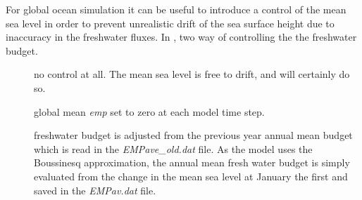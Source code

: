 \documentclass[../main/NEMO_manual]{subfiles}
\begin{document}
For global ocean simulation it can be useful to introduce a control of the mean sea level in order to
prevent unrealistic drift of the sea surface height due to inaccuracy in the freshwater fluxes.
In \NEMO, two way of controlling the the freshwater budget. 
\begin{description}
\item[]
  no control at all.
  The mean sea level is free to drift, and will certainly do so.
\item[]
  global mean \textit{emp} set to zero at each model time step. 
\item[]
  freshwater budget is adjusted from the previous year annual mean budget which
  is read in the \textit{EMPave\_old.dat} file.
  As the model uses the Boussinesq approximation, the annual mean fresh water budget is simply evaluated from
  the change in the mean sea level at January the first and saved in the \textit{EMPav.dat} file. 
\end{description}




\biblio

\pindex
\end{document}
